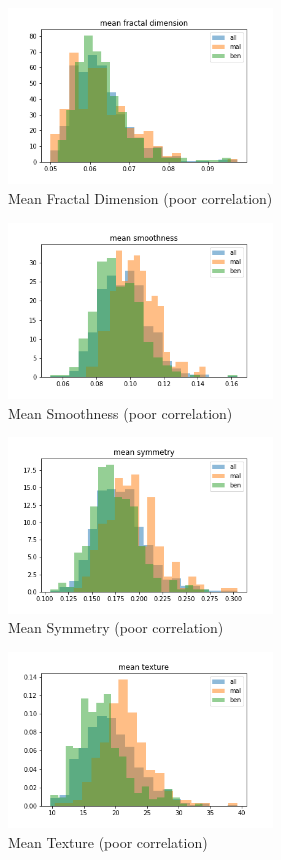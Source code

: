 \documentclass[conference]{IEEEtran}
\begin{document}
\begin{figure}[htbp]
\centerline{\includegraphics [width = 7cm] {mean fractal dimension.png}}
\caption{Mean Fractal Dimension (poor correlation)}
\label{fig}
\end{figure}
\begin{figure}[htbp]
\centerline{\includegraphics [width = 7cm] {mean smoothness.png}}
\caption{Mean Smoothness (poor correlation)}
\label{fig}
\end{figure}
\begin{figure}[htbp]
\centerline{\includegraphics [width = 7cm] {mean symmetry.png}}
\caption{Mean Symmetry (poor correlation)}
\label{fig}
\end{figure}
\begin{figure}[htbp]
\centerline{\includegraphics [width = 7cm] {mean texture.png}}
\caption{Mean Texture (poor correlation)}
\label{fig}
\end{figure}
\end{document}
